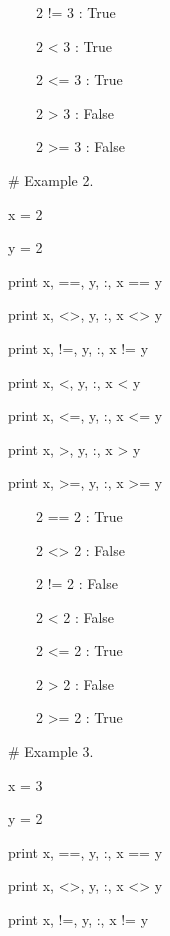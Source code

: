 \documentclass[12pt,oneside]{book}
\begin{document}
\ \ \ \ 2 != 3 : True

\ \ \ \ 2 {\textless} 3 : True

\ \ \ \ 2 {\textless}= 3 : True

\ \ \ \ 2 {\textgreater} 3 : False

\ \ \ \ 2 {\textgreater}= 3 : False


\# Example 2.

x = 2

y = 2 \ 


print x, {\textquotedbl}=={\textquotedbl}, y, {\textquotedbl}:{\textquotedbl}, x == y

print x, {\textquotedbl}{\textless}{\textgreater}{\textquotedbl}, y, {\textquotedbl}:{\textquotedbl}, x {\textless}{\textgreater} y

print x, {\textquotedbl}!={\textquotedbl}, y, {\textquotedbl}:{\textquotedbl}, x != y

print x, {\textquotedbl}{\textless}{\textquotedbl}, y, {\textquotedbl}:{\textquotedbl}, x {\textless} y

print x, {\textquotedbl}{\textless}={\textquotedbl}, y, {\textquotedbl}:{\textquotedbl}, x {\textless}= y

print x, {\textquotedbl}{\textgreater}{\textquotedbl}, y, {\textquotedbl}:{\textquotedbl}, x {\textgreater} y

print x, {\textquotedbl}{\textgreater}={\textquotedbl}, y, {\textquotedbl}:{\textquotedbl}, x {\textgreater}= y

{\textbar}

\ \ \ \ 2 == 2 : True

\ \ \ \ 2 {\textless}{\textgreater} 2 : False

\ \ \ \ 2 != 2 : False

\ \ \ \ 2 {\textless} 2 : False

\ \ \ \ 2 {\textless}= 2 : True

\ \ \ \ 2 {\textgreater} 2 : False

\ \ \ \ 2 {\textgreater}= 2 : True


\# Example 3.

x = 3

y = 2 \ 


print x, {\textquotedbl}=={\textquotedbl}, y, {\textquotedbl}:{\textquotedbl}, x == y

print x, {\textquotedbl}{\textless}{\textgreater}{\textquotedbl}, y, {\textquotedbl}:{\textquotedbl}, x {\textless}{\textgreater} y

print x, {\textquotedbl}!={\textquotedbl}, y, {\textquotedbl}:{\textquotedbl}, x != y
\end{document}
